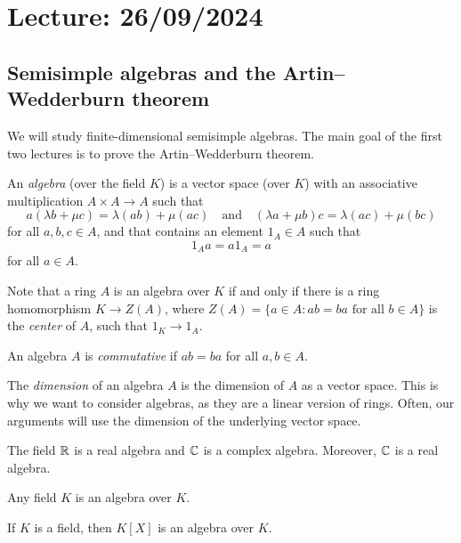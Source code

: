 \section{Lecture: 26/09/2024}

\subsection{Semisimple algebras and the Artin--Wedderburn theorem}

We will study  
finite-dimensional semisimple algebras. The main goal of the first two lectures is to
prove the Artin--Wedderburn theorem. 

\begin{definition}
	An \emph{algebra} (over the field $K$) is a vector space (over $K$) 
	with an associative multiplication $A\times A\to A$ such that
	\[
    a(\lambda b+\mu c)=\lambda(ab)+\mu(ac)\quad\text{and}\quad 
	(\lambda a+\mu b)c=\lambda(ac)+\mu (bc)
 \]
    for all $a,b,c\in A$, and 
	that contains an element $1_A\in A$ such that 
 \[
 1_Aa=a1_A=a
 \]
 for all $a\in A$.
 \end{definition}

Note that a ring $A$ is an algebra over $K$ 
if and only if 
there is a ring homomorphism $K\to Z(A)$, where $Z(A)=\{a\in A:ab=ba\text{ for all $b\in A$}\}$ is the \emph{center} of $A$, 
such that $1_K\to 1_A$. 

\begin{definition}
	An algebra $A$ is \emph{commutative} if $ab=ba$ for all $a,b\in A$. 
\end{definition}

The \emph{dimension} of an algebra $A$ is the dimension of $A$ as a vector space. This is why we want to consider algebras, as 
they are a linear version of rings. Often, our arguments will use the dimension of the underlying vector space.  

\begin{example}
	The field $\mathbb{R}$ is a real algebra and  
	$\mathbb{C}$ is a complex algebra. Moreover, $\mathbb{C}$ is a real algebra. 
\end{example}

Any field $K$ is an algebra over $K$.

\begin{example}
	If $K$ is a field, then $K[X]$ is an algebra over $K$. 
\end{example}

